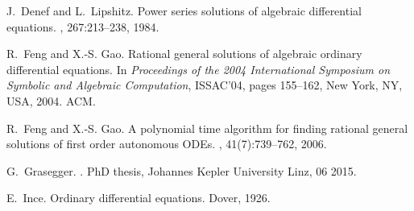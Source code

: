 \documentclass[10pt,a4paper]{article}
\begin{document}
\begin{thebibliography}{10}


J.~Denef and L.~Lipshitz.
\newblock Power series solutions of algebraic differential equations.
, 267:213--238, 1984.

R.~Feng and X.-S. Gao.
\newblock Rational general solutions of algebraic ordinary differential
  equations.
\newblock In {\em Proceedings of the 2004 International Symposium on Symbolic
  and Algebraic Computation}, ISSAC'04, pages 155--162, New York, NY, USA,
  2004. ACM.

R.~Feng and X.-S. Gao.
\newblock A polynomial time algorithm for finding rational general solutions of
  first order autonomous {ODEs}.
, 41(7):739--762, 2006.

% 
% 
% 

G.~Grasegger.
.
\newblock PhD thesis, Johannes Kepler University Linz, 06 2015.



E.~Ince.
\newblock Ordinary differential equations.
\newblock Dover, 1926.
% 



\end{thebibliography}
\end{document}
